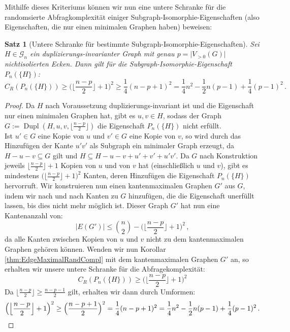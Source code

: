 \documentclass[10pt,a4paper, footheight=1mm, bibliography=totoc]{scrreprt}
\newtheorem{Satz}[definition]{Satz}
\theoremstyle{definition}
\DeclareMathOperator\Dupl{Dupl}
\begin{document}
Mithilfe dieses Kriteriums können wir nun eine
untere Schranke für die randomsierte Abfragkomplexität
einiger Subgraph-Isomorphie-Eigenschaften (also Eigenschaften,
die nur einen minimalen Graphen haben) beweisen:
\begin{Satz}
[Untere Schranke für bestimmte Subgraph-Isomorphie-Eigenschaften]
\label{thm:SubgraphIsomorphismLowerBound}
Sei $H\in \mathcal{G}_n$ ein duplizierungs-invarianter Graph
mit genau $p = \big|V_{>0}(G)\big|$ nichtisolierten Ecken.
Dann gilt für die Subgraph-Isomorphie-Eigenschaft $P_n(\{H\})$:
$$ C_R(P_n(\{H\})) \geq 
\Big ( \Big \lfloor  \frac{n-p}{2} \Big \rfloor + 1 \Big)^{2} \geq
\frac{1}{4}(n-p+1)^2 =
\frac{1}{4}n^2 - \frac{1}{2}n(p-1) + \frac{1}{4}(p-1)^2\,.
$$
\end{Satz}
\begin{proof}
Da $H$ nach Voraussetzung duplizierungs-invariant ist und die 
Eigenschaft nur einen minimalen Graphen hat, gibt es
$u,v \in H$, sodass der Graph 
$G:= \Dupl(H, u, v, \big \lfloor \frac{n-p}{2} \big \rfloor)$
die Eigenschaft $P_n(\{H\})$ nicht erfüllt. \\
Ist $u'\in G$ eine Kopie von $u$ und $v' \in G$ eine Kopie von $v$,
so wird durch das Hinzufügen der Kante $u'v'$ als Subgraph ein
minimaler Graph erzeugt, da $H-u-v \subseteq G$ gilt und
$H \subseteq H-u-v + u' + v' + u'v'$. Da $G$ nach Konstruktion
jeweils $\big \lfloor \frac{n-p}{2} \big \rfloor+1$ Kopien von
$u$  und von $v$ hat (einschließlich $u$ und $v$), gibt es mindestens
$\Big( \Big \lfloor  \frac{n-p}{2} \Big \rfloor + 1 \Big)^{2}$
Kanten, deren Hinzufügen die Eigenschaft $P_n(\{H\})$ hervorruft.
Wir konstruieren nun einen kantenmaximalen Graphen $G'$ aus
$G$, indem wir nach und nach Kanten zu $G$ hinzufügen, die die
Eigenschaft unerfüllt lassen, bis dies nicht mehr möglich ist.
Dieser Graph $G'$ hat nun eine Kantenanzahl von:
$$ |E(G')| \leq \binom{n}{2} - 
\Big ( \Big \lfloor  \frac{n-p}{2} \Big \rfloor + 1 \Big)^{2}\,,$$
da alle Kanten zwischen Kopien von $u$ und $v$ nicht zu dem
kantenmaximalen Graphen gehören können. Wenden wir nun
Korollar \ref{thm:EdgeMaximalRandCompl} mit dem kantenmaximalen
Graphen $G'$ an, so erhalten wir unsere untere Schranke für
die Abfragekomplexität:
$$ C_R(P_n(\{H\})) \geq 
\Big (  \Big \lfloor  \frac{n-p}{2} \Big \rfloor + 1 \Big )^2$$
Da $\Big \lfloor  \frac{n-p}{2} \Big \rfloor \geq \frac{n-p-1}{2}$
gilt, erhalten wir dann durch Umformen:
\begin{equation*}
\Big ( \Big \lfloor  \frac{n-p}{2} \Big \rfloor + 1 \Big)^{2} \geq
\Big ( \frac{n-p+1}{2} \Big ) ^2 =
\frac{1}{4}(n-p+1)^2 =
\frac{1}{4}n^2 - \frac{1}{2}n(p-1) + \frac{1}{4}(p-1)^2\,. \qedhere
\end{equation*}
\end{proof}
\end{document}
